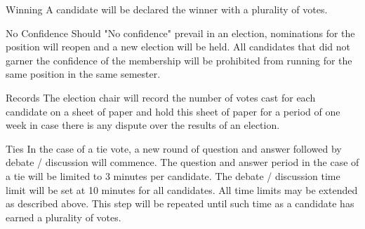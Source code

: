 \begin{enumsubsection}
\begin{enumsubsubsection}
\item{Winning} A candidate will be declared the winner with a plurality of votes. 
\item{No Confidence} Should "No confidence" prevail in an election, nominations for the position will reopen and a new election will be held. All candidates that did not garner the confidence of the membership will be prohibited from running for the same position in the same semester.
\item{Records} The election chair will record the number of votes cast for each candidate on a sheet of paper and hold this sheet of paper for a period of one week in case there is any dispute over the results of an election.
\end{enumsubsubsection}

\item{Ties} In the case of a tie vote, a new round of question and answer followed by debate / discussion will commence. The question and answer period in the case of a tie will be limited to 3 minutes per candidate. The debate / discussion time limit will be set at 10 minutes for all candidates. All time limits may be extended as described above. This step will be repeated until such time as a candidate has earned a plurality of votes.

\end{enumsubsection}


